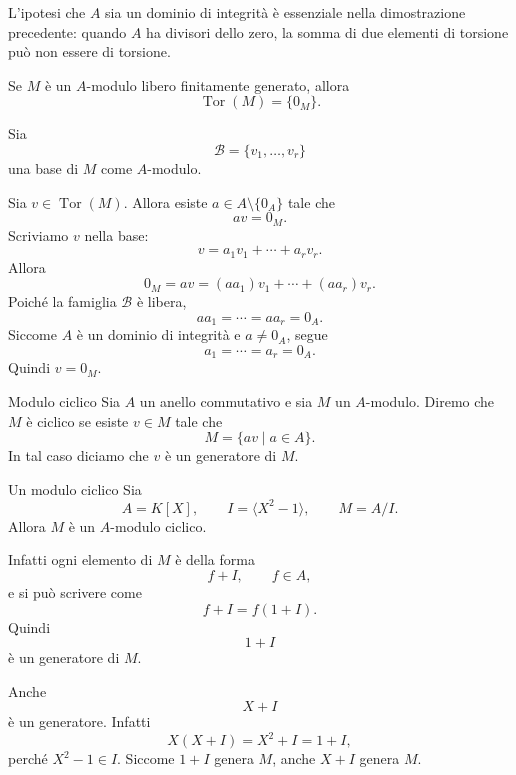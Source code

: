 \documentclass[a4paper]{article}
\begin{document}
\begin{radioactive}
\begin{snippetremark}{}
    L'ipotesi che \(A\) sia un dominio di integrità è essenziale nella dimostrazione precedente: quando \(A\) ha divisori dello zero, la somma di due elementi di torsione può non essere di torsione.
\end{snippetremark}
\end{radioactive}

\begin{radioactive}
\begin{snippetproposition}{}
    Se \(M\) è un \(A\)-modulo libero finitamente generato, allora
    \[
        \operatorname{Tor}(M)=\{0_M\}.
    \]
\end{snippetproposition}
\end{radioactive}

\begin{radioactive}
\begin{snippetproof}{}
    Sia
    \[
        \mathcal{B}=\{v_1,\ldots,v_r\}
    \]
    una base di \(M\) come \(A\)-modulo.

    Sia \(v\in \operatorname{Tor}(M)\). Allora esiste \(a\in A\setminus\{0_A\}\) tale che
    \[
        av=0_M.
    \]
    Scriviamo \(v\) nella base:
    \[
        v=a_1v_1+\cdots+a_rv_r.
    \]
    Allora
    \[
        0_M
        =
        av
        =
        (aa_1)v_1+\cdots+(aa_r)v_r.
    \]
    Poiché la famiglia \(\mathcal{B}\) è libera,
    \[
        aa_1=\cdots=aa_r=0_A.
    \]
    Siccome \(A\) è un dominio di integrità e \(a\neq 0_A\), segue
    \[
        a_1=\cdots=a_r=0_A.
    \]
    Quindi \(v=0_M\).
\end{snippetproof}
\end{radioactive}

\begin{radioactive}
\begin{snippetdefinition}{Modulo ciclico}
    Sia \(A\) un anello commutativo e sia \(M\) un \(A\)-modulo.
    Diremo che \(M\) è ciclico se esiste \(v\in M\) tale che
    \[
        M=\{av\mid a\in A\}.
    \]
    In tal caso diciamo che \(v\) è un generatore di \(M\).
\end{snippetdefinition}
\end{radioactive}

\begin{radioactive}
\begin{snippetexample}{Un modulo ciclico}
    Sia
    \[
        A=K[X],
        \qquad
        I=\langle X^2-1 \rangle,
        \qquad
        M=A/I.
    \]
    Allora \(M\) è un \(A\)-modulo ciclico.

    Infatti ogni elemento di \(M\) è della forma
    \[
        f+I,
        \qquad
        f\in A,
    \]
    e si può scrivere come
    \[
        f+I=f(1+I).
    \]
    Quindi
    \[
        1+I
    \]
    è un generatore di \(M\).

    Anche
    \[
        X+I
    \]
    è un generatore. Infatti
    \[
        X(X+I)=X^2+I=1+I,
    \]
    perché \(X^2-1\in I\). Siccome \(1+I\) genera \(M\), anche \(X+I\) genera \(M\).
\end{snippetexample}
\end{radioactive}
\end{document}
